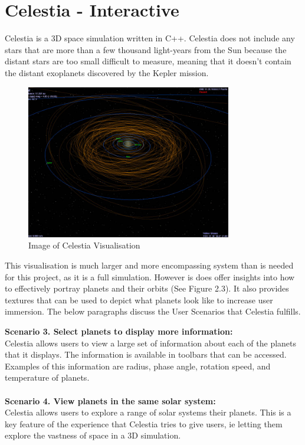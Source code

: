\section{Celestia - Interactive}
Celestia \cite{celestia} is a 3D space simulation written in C++. Celestia does
not include any stars that are more than a
few thousand light-years from the Sun because the distant
stars are too small difficult to measure, meaning that it doesn't contain
the distant exoplanets discovered by the Kepler mission. 
\begin{figure}[H]
  \centering
      \includegraphics[width=0.8\textwidth]{images/celestia.jpg}
  \caption{Image of Celestia Visualisation}
\end{figure}
This visualisation is much larger and more encompassing system than is needed
for this project, as it is a full simulation. However is does offer
insights into how to effectively portray planets and their orbits (See Figure
2.3). It also provides textures that can be used to depict
what planets look like to increase user immersion. The below paragraphs discuss
the User Scenarios that Celestia fulfills.

{\bf Scenario 3. Select planets to display more information:\\}
Celestia allows users to view a large set of information about each of the
planets that it displays. The information is available in toolbars
that can be accessed. Examples of this information are radius, phase angle,
rotation speed, and temperature of planets.  
\\\\
{\bf Scenario 4. View planets in the same solar system:\\}
Celestia allows users to explore a range of solar systems their planets. This is
a key feature of the experience that
Celestia tries to give users, ie letting them explore the vastness of space in a
3D simulation. 

